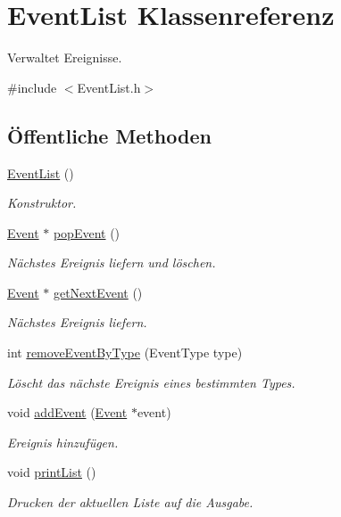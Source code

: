 \hypertarget{classEventList}{}\section{Event\+List Klassenreferenz}
\label{classEventList}


Verwaltet Ereignisse.  




{\ttfamily \#include $<$Event\+List.\+h$>$}

\subsection*{Öffentliche Methoden}
\begin{DoxyCompactItemize}
\item 
\hyperlink{classEventList_afb3f0b055c2b7c5431cfe234ffcda269}{Event\+List} ()
\begin{DoxyCompactList}\small\item\em Konstruktor. \end{DoxyCompactList}\item 
\hyperlink{classEvent}{Event} $\ast$ \hyperlink{classEventList_a0a14cce1690774fa3c88a694bc4f2572}{pop\+Event} ()
\begin{DoxyCompactList}\small\item\em Nächstes Ereignis liefern und löschen. \end{DoxyCompactList}\item 
\hyperlink{classEvent}{Event} $\ast$ \hyperlink{classEventList_aa426ac93e711b567b66f7ba3c51cb2bd}{get\+Next\+Event} ()
\begin{DoxyCompactList}\small\item\em Nächstes Ereignis liefern. \end{DoxyCompactList}\item 
int \hyperlink{classEventList_a3bd963a8a43cc5efcbe0059e58425985}{remove\+Event\+By\+Type} (Event\+Type type)
\begin{DoxyCompactList}\small\item\em Löscht das nächste Ereignis eines bestimmten Types. \end{DoxyCompactList}\item 
void \hyperlink{classEventList_ab17b4c5ef72e741876a5563a5a281d74}{add\+Event} (\hyperlink{classEvent}{Event} $\ast$event)
\begin{DoxyCompactList}\small\item\em Ereignis hinzufügen. \end{DoxyCompactList}\item 
void \hyperlink{classEventList_a7e32e3d4bc10adb837048937a21bfb6b}{print\+List} ()\hypertarget{classEventList_a7e32e3d4bc10adb837048937a21bfb6b}{}\label{classEventList_a7e32e3d4bc10adb837048937a21bfb6b}

\begin{DoxyCompactList}\small\item\em Drucken der aktuellen Liste auf die Ausgabe. \end{DoxyCompactList}\end{DoxyCompactItemize}


